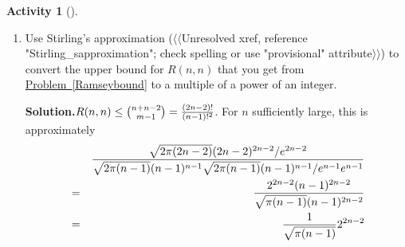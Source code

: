\documentclass[10pt,]{book}
\theoremstyle{plain}
\theoremstyle{definition}
\newtheorem{activity}[project]{Activity}
\numberwithin{equation}{chapter}
\newcommand{\amp}{&}
\begin{document}
\begin{activity}[]
\begin{enumerate}[label=(\alph*)]
~\par
\item Use Stirling's approximation ({$\langle\langle$Unresolved xref, reference "Stirling\_sapproximation"; check spelling or use "provisional" attribute$\rangle\rangle$}) to convert the upper bound for \(R(n,n)\) that you get from \hyperref[Ramseybound]{Problem~\ref{Ramseybound}} to a multiple of a power of an integer.%
\par\medskip\noindent%
\textbf{Solution.}\quad \(R(n,n)\le {n+n-2\choose m-1}={(2n-2)!\over (n-1)!^2}\). For \(n\) sufficiently large, this is approximately%
\begin{align*}
\amp \amp \sqrt{2\pi (2n-2)}(2n-2)^{2n-2}/e^{2n-2}\over
\sqrt{2 \pi (n-1)}(n-1)^{n-1}\sqrt{2 \pi
(n-1)}(n-1)^{n-1}/e^{n-1}e^{n-1}\\
\amp =\amp {2^{2n-2}(n-1)^{2n-2}\over\sqrt{\pi
(n-1)}(n-1)^{2n-2}}\\
\amp =\amp {1\over \sqrt{\pi
(n-1)}}2^{2n-2}
\end{align*}
%

\end{enumerate}
\end{activity}
\typeout{************************************************}
\typeout{************************************************}
\end{document}
